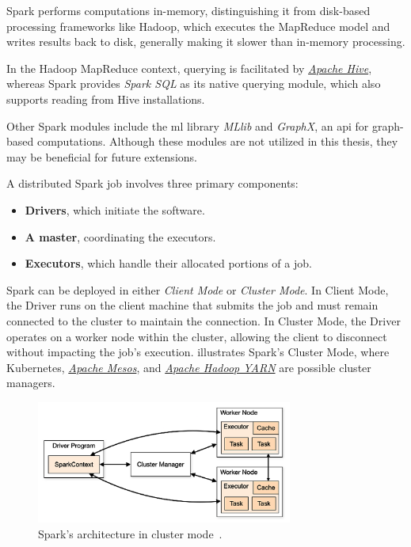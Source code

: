 Spark performs computations in-memory, distinguishing it from disk-based processing frameworks like Hadoop, which executes the MapReduce model and writes results back to disk, generally making it slower than in-memory processing.

In the Hadoop MapReduce context, querying is facilitated by \href{https://hive.apache.org/}{\textit{Apache Hive}}, whereas Spark provides \textit{Spark SQL} as its native querying module, which also supports reading from Hive installations.

Other Spark modules include the \ac{ml} library \textit{MLlib} and \textit{GraphX}, an \ac{api} for graph-based computations.
Although these modules are not utilized in this thesis, they may be beneficial for future extensions.

A distributed Spark job involves three primary components:

\begin{itemize}
    \item \textbf{Drivers}, which initiate the software.
    \item \textbf{A master}, coordinating the executors.
    \item \textbf{Executors}, which handle their allocated portions of a job.
\end{itemize}

Spark can be deployed in either \textit{Client Mode} or \textit{Cluster Mode}.
In Client Mode, the Driver runs on the client machine that submits the job and must remain connected to the cluster to maintain the connection.
In Cluster Mode, the Driver operates on a worker node within the cluster, allowing the client to disconnect without impacting the job's execution.
 illustrates Spark's Cluster Mode, where Kubernetes, \href{https://mesos.apache.org/}{\textit{Apache Mesos}}, and \href{https://hadoop.apache.org/docs/current/hadoop-yarn/hadoop-yarn-site/YARN.html}{\textit{Apache Hadoop YARN}} are possible cluster managers.

\begin{figure}[H]
    \centering
    \includegraphics[width=0.75\textwidth]{figures/spark-cluster.png}
    \caption{Spark's architecture in cluster mode~\cite{ASF2024c}.}
    \label{fig:spark-cluster}
\end{figure}


